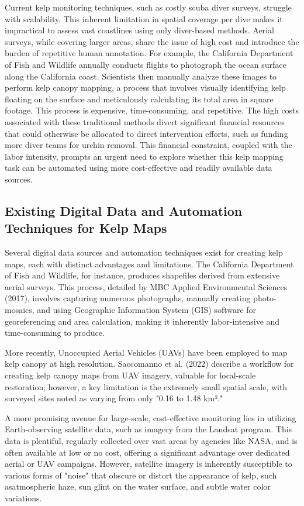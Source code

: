 \documentclass{article}
\begin{document}
Current kelp monitoring techniques, such as costly scuba diver surveys, struggle with scalability. This inherent limitation in spatial coverage per dive makes it impractical to assess vast coastlines using only diver-based methods. Aerial surveys, while covering larger areas, share the issue of high cost and introduce the burden of repetitive human annotation. For example, the California Department of Fish and Wildlife annually conducts flights to photograph the ocean surface along the California coast. Scientists then manually analyze these images to perform kelp canopy mapping, a process that involves visually identifying kelp floating on the surface and meticulously calculating its total area in square footage. This process is expensive, time-consuming, and repetitive. The high costs associated with these traditional methods divert significant financial resources that could otherwise be allocated to direct intervention efforts, such as funding more diver teams for urchin removal. This financial constraint, coupled with the labor intensity, prompts an urgent need to explore whether this kelp mapping task can be automated using more cost-effective and readily available data sources.

\subsection{Existing Digital Data and Automation Techniques for Kelp Maps} 

Several digital data sources and automation techniques exist for creating kelp maps, each with distinct advantages and limitations. The California Department of Fish and Wildlife, for instance, produces shapefiles derived from extensive aerial surveys. This process, detailed by MBC Applied Environmental Sciences (2017), involves capturing numerous photographs, manually creating photo-mosaics, and  using Geographic Information System (GIS) software for georeferencing and area calculation, making it inherently labor-intensive and time-consuming to produce.

More recently, Unoccupied Aerial Vehicles (UAVs) have been employed to map kelp canopy at high resolution. Saccomanno et al. (2022) describe a workflow for creating kelp canopy maps from UAV imagery, valuable for local-scale restoration; however, a key limitation is the extremely small spatial scale, with surveyed sites noted as varying from only "0.16 to 1.48 km²."

A more promising avenue for large-scale, cost-effective monitoring lies in utilizing Earth-observing satellite data, such as imagery from the Landsat program. This data is plentiful, regularly collected over vast areas by agencies like NASA, and is often available at low or no cost, offering a significant advantage over dedicated aerial or UAV campaigns. However, satellite imagery is inherently susceptible to various forms of "noise" that obscure or distort the appearance of kelp, such asatmospheric haze, sun glint on the water surface, and subtle water color variations. 
\end{document}
